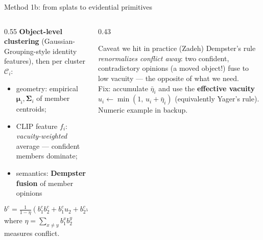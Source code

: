 \documentclass[aspectratio=169,10pt]{beamer}
\newcommand{\good}[1]{{\color{uLow}#1}}
\newcommand{\bad}[1]{{\color{uHigh}#1}}
\begin{document}
\begin{frame}{Method 1b: from splats to evidential primitives}
  \begin{columns}[T]
    \begin{column}{0.55\textwidth}
      \textbf{Object-level clustering} (Gaussian-Grouping-style identity
      features), then per cluster $\mathcal{C}_i$:
      \begin{itemize}
        \item geometry: empirical $\bm\mu_i, \bm\Sigma_i$ of member centroids;
        \item CLIP feature $f_i$: \emph{vacuity-weighted} average ---
              confident members dominate;
        \item semantics: \textbf{Dempster fusion} of member opinions
      \end{itemize}
      \begin{equation*}
        b^c = \tfrac{1}{1-\eta}\!\left(b_1^c b_2^c + b_1^c u_2 + b_2^c u_1\right),
        \quad u = \tfrac{u_1 u_2}{1-\eta},
      \end{equation*}
      where $\eta = \sum_{x \neq y} b_1^x b_2^y$ measures conflict.
    \end{column}
    \begin{column}{0.43\textwidth}
      \begin{block}{\alert{Caveat we hit in practice (Zadeh)}}
        \small Dempster's rule \emph{renormalizes conflict away}: two
        confident, contradictory opinions (a moved object!) fuse to
        \bad{low} vacuity --- the opposite of what we need.\\[1mm]
        Fix: accumulate $\bar\eta_i$ and use the \textbf{effective vacuity}
        $u_i \leftarrow \min(1,\, u_i + \bar\eta_i)$ (equivalently Yager's
        rule). Numeric example in backup.
      \end{block}
      \vspace{1mm}
      \centering
    \end{column}
  \end{columns}
\end{frame}
\end{document}
